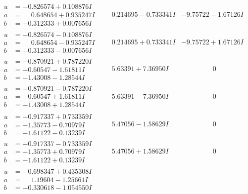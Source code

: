 \documentclass[1p]{elsarticle_modified}
\theoremstyle{definition}
\begin{document}
$$\begin{array}{c|c|c}
\begin{aligned}
u &= -0.826574 + 0.108876 I \\
a &= \phantom{-}0.648654 + 0.935247 I \\
b &= -0.312333 + 0.007656 I\end{aligned}
 & \phantom{-}0.214695 - 0.733341 I & -9.75722 - 1.67126 I \\ \hline\begin{aligned}
u &= -0.826574 - 0.108876 I \\
a &= \phantom{-}0.648654 - 0.935247 I \\
b &= -0.312333 - 0.007656 I\end{aligned}
 & \phantom{-}0.214695 + 0.733341 I & -9.75722 + 1.67126 I \\ \hline\begin{aligned}
u &= -0.870921 + 0.787220 I \\
a &= -0.60547 - 1.61811 I \\
b &= -1.43008 - 1.28544 I\end{aligned}
 & \phantom{-}5.63391 + 7.36950 I & \phantom{-0.000000 } 0 \\ \hline\begin{aligned}
u &= -0.870921 - 0.787220 I \\
a &= -0.60547 + 1.61811 I \\
b &= -1.43008 + 1.28544 I\end{aligned}
 & \phantom{-}5.63391 - 7.36950 I & \phantom{-0.000000 } 0 \\ \hline\begin{aligned}
u &= -0.917337 + 0.733359 I \\
a &= -1.35773 - 0.70979 I \\
b &= -1.61122 - 0.13239 I\end{aligned}
 & \phantom{-}5.47056 - 1.58629 I & \phantom{-0.000000 } 0 \\ \hline\begin{aligned}
u &= -0.917337 - 0.733359 I \\
a &= -1.35773 + 0.70979 I \\
b &= -1.61122 + 0.13239 I\end{aligned}
 & \phantom{-}5.47056 + 1.58629 I & \phantom{-0.000000 } 0 \\ \hline\begin{aligned}
u &= -0.698347 + 0.435308 I \\
a &= \phantom{-}1.19604 - 1.25661 I \\
b &= -0.330618 - 1.054550 I\end{aligned}

\end{array}$$
\end{document}
